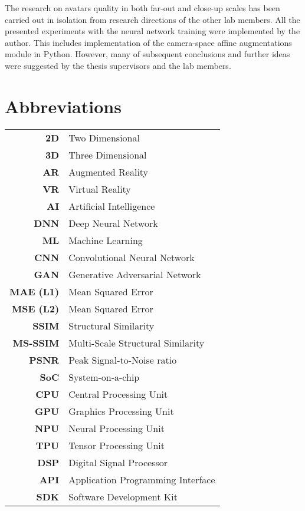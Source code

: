 The research on avatars quality in both far-out and close-up scales has been carried out in isolation from research directions of the other lab members. All the presented experiments with the neural network training were implemented by the author. This includes implementation of the camera-space affine augmentations module in Python. However, many of subsequent conclusions and further ideas were suggested by the thesis supervisors and the lab members.
 
\newpage
\section*{\centering Abbreviations}

\begin{table}[!ht]
	\vspace{-1em}
	\centering
	\begin{tabular}{>{\bf}r l}
		2D & Two Dimensional \\
		3D & Three Dimensional \\
		AR & Augmented Reality \\
		VR & Virtual Reality \\
		AI & Artificial Intelligence \\
		DNN & Deep Neural Network \\
		ML & Machine Learning \\
		CNN & Convolutional Neural Network \\
		GAN & Generative Adversarial Network \\
		MAE (L1) & Mean Squared Error \\
		MSE (L2) & Mean Squared Error \\
		SSIM & Structural Similarity \\
		MS-SSIM & Multi-Scale Structural Similarity \\
		PSNR & Peak Signal-to-Noise ratio \\
		SoC & System-on-a-chip \\
		CPU & Central Processing Unit \\
		GPU & Graphics Processing Unit \\
		NPU & Neural Processing Unit \\
		TPU & Tensor Processing Unit \\
		DSP & Digital Signal Processor \\
		API & Application Programming Interface \\
		SDK & Software Development Kit \\

\end{tabular}
\end{table}
